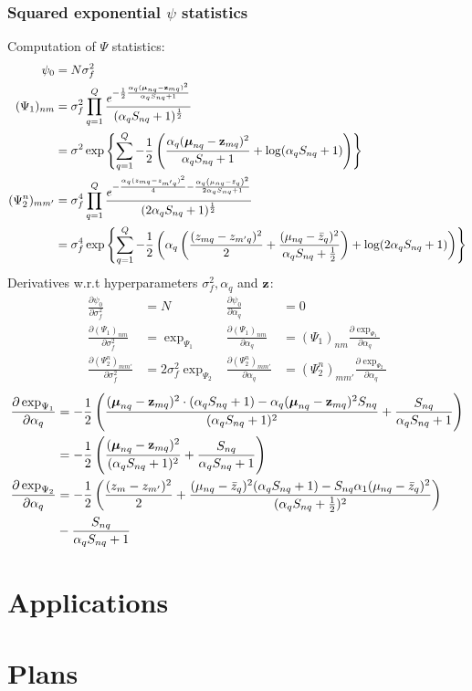 \documentclass[11pt, a4paper]{article}
\begin{document}
\subsubsection{Squared exponential $\psi$ statistics}
\label{sec:SEpsi}
Computation of $\Psi$ statistics:
\begin{align*}
  \label{eq:psi_se}
  \psi_0 & = N\sigma_f^2\\
  (\Psi_1)_{nm} & = \sigma^2_f \prod_{q=1}^Q
  \frac{ e^{ - \frac{1}{2} \frac{ \alpha_q ({\boldsymbol{\mu}}_{nq}  -
        {\bf z}_{mq})^2}{\alpha_q S_{nq} + 1}}}
  {( \alpha_q S_{nq} + 1)^{\frac{1}{2}}} \\
  & = \sigma^2 \exp\left\{
    \sum_{q=1}^Q-\frac12 
    \left( \frac{\alpha_q({\boldsymbol{\mu}}_{nq} - {\bf z}_{mq})^2} {\alpha_qS_{nq}+1} 
      + \log(\alpha_qS_{nq}+1)
    \right)
  \right\}\\
  (\Psi^n_2)_{m m'} & = \sigma_f^4 
  \prod_{q=1}^Q \frac{ e^{-  \frac{\alpha_q (z_{mq} -
        z_{m'q})^2}{4} - \frac{\alpha_q \left(\mu_{nq} -
          \bar{z}_{q} \right)^2}{2 \alpha_q S_{nq} + 1}}}
  {(2 \alpha_q S_{nq} + 1)^{\frac{1}{2}}}\\
  & = \sigma_f^4\exp\left\{\sum_{q=1}^Q-\frac12\left(\alpha_q\left(\frac{(z_{mq}-z_{m'q})^2}2 + \frac{(\mu_{nq}-\bar z_q)^2}{\alpha_qS_{nq}+\frac12}\right) + \log(2\alpha_qS_{nq}+1)\right)\right\}
\end{align*}
Derivatives w.r.t hyperparameters $\sigma^2_f, \alpha_q$ and $\bf z$:
\begin{align*}
  \frac{\partial\psi_0}{\partial\sigma_f^2} & = N & \frac{\partial\psi_0}{\partial\alpha_q} & = 0\\
  \frac{\partial(\Psi_1)_{nm}}{\partial\sigma_f^2} & = \exp_{\Psi_1} 
  & \frac{\partial(\Psi_1)_{nm}}{\partial\alpha_q} & = (\Psi_1)_{nm}\frac{\partial\exp_{\Psi_1}}{\partial\alpha_q} \\
  \frac{\partial(\Psi_2^n)_{mm'}}{\partial\sigma_f^2} & = 2\sigma_f^2\exp_{\Psi_2} 
  & \frac{\partial(\Psi_2^n)_{mm'}}{\partial\alpha_q} & = (\Psi_2^n)_{mm'}\frac{\partial\exp_{\Psi_2}}{\partial\alpha_q} 
\end{align*}
\begin{align*}
    \frac{\partial\exp_{\Psi_1}}{\partial\alpha_q} &= -\frac12\left(\frac{(\boldsymbol{\mu}_{nq} - {\bf z}_{mq})^2\cdot(\alpha_qS_{nq}+1)-\alpha_q(\boldsymbol{\mu}_{nq} - {\bf z}_{mq})^2S_{nq}}{(\alpha_qS_{nq}+1)^2} + \frac{S_{nq}}{\alpha_qS_{nq}+1} \right)\\
    &= -\frac12\left(\frac{(\boldsymbol{\mu}_{nq} - {\bf z}_{mq})^2}{(\alpha_qS_{nq}+1)^2} + \frac{S_{nq}}{\alpha_qS_{nq}+1} \right)\\
  \frac{\partial\exp_{\Psi_2}}{\partial\alpha_q} &= -\frac12\left(\frac{(z_m-z_{m'})^2}2 + \frac{(\mu_{nq} - \bar z_q)^2(\alpha_qS_{nq}+1) - S_{nq}\alpha_1(\mu_{nq} - \bar z_q)^2}{(\alpha_qS_{nq}+\frac12)^2}\right)\\
  & - \frac{S_{nq}}{\alpha_qS_{nq}+1}
\end{align*}
\section{Applications}
\label{sec:applications}


\section{Plans}
\label{sec:plans}





\end{document}

